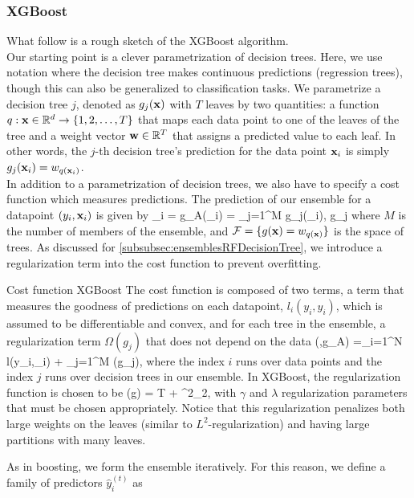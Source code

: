 \subsubsection{XGBoost}
\label{subsubsec:ensemblesXGBoost}
What follow is a rough sketch of the XGBoost algorithm.\\
Our starting point is a clever parametrization of decision trees. Here, we use notation where the decision tree makes continuous predictions (regression trees), though this can also be generalized to classification tasks. We parametrize a decision tree $j$, denoted as $g_j(\mathbf{x})$ with $T$ leaves by two quantities: a function $q: \mathbf{x} \in \mathbb{R}^d \rightarrow \{1,2,\dots, T\}$ that maps each data point to one of the leaves of the tree and a weight vector $\mathbf{w} \in \mathbb{R}^T$ that assigns a predicted value to each leaf. In other words, the $j$-th decision tree's prediction for the data point $\mathbf{x}_i$ is simply $g_j(\mathbf{x}_i) = w_{q(\mathbf{x}_i)}$.\\
In addition to a parametrization of decision trees, we also have to specify a cost function which measures predictions. The prediction of our ensemble for a datapoint $(y_i,\mathbf{x}_i)$ is given by
\bse 
{}_i = g_A(\mx_i) = \sum_{j=1}^M g_j(\mx_i), \quad g_j \in {} 
\ese 
where $M$ is the number of members of the ensemble, and $\mathcal{F}=\{g(\mathbf{x}) = w_{q(\mathbf{x})} \}$ is the space of trees. As discussed for \ref{subsubsec:ensemblesRFDecisionTree}, we introduce a regularization term into the cost function to prevent overfitting.
\begin{mybox}{Cost function XGBoost}
	The cost function is composed of two terms, a term that measures the goodness of predictions on each datapoint, $l_i(y_i,\hat{y}_i)$, which is assumed to be differentiable and convex, and for each tree in the ensemble, a regularization term $\Omega(g_j)$ that does not depend on the data 
	\be 
	\label{eq:ensemblesXGBoostCostfct}
	\mC (\mX,g_A) =\sum_{i=1}^N l(y_i,_i) + \sum_{j=1}^M \Omega(g_j),
	\ee 
	where the index $i$ runs over data points and the index $j$ runs over decision trees in our ensemble. In XGBoost, the regularization function is chosen to be
	\be 
	\Omega(g) = \gamma T + \norm{\mw}^2_2,
	\ee 
	with $\gamma$ and $\lambda$ regularization parameters that must be chosen appropriately. Notice that this regularization penalizes both large weights on the leaves (similar to $L^2$-regularization) and having large partitions with many leaves.
\end{mybox}
As in boosting, we form the ensemble iteratively. For this reason, we define a family of predictors $\hat{y}^{(t)}_i$ as 
